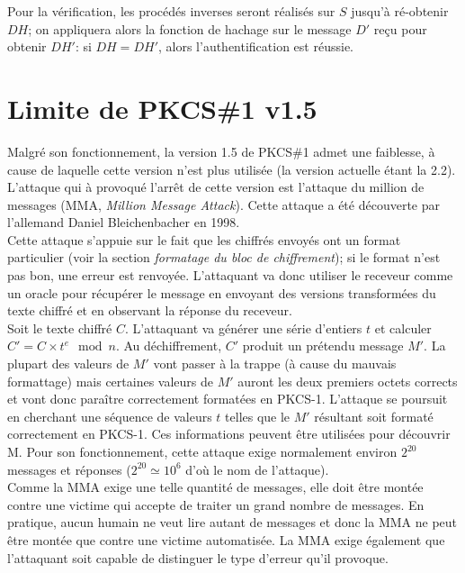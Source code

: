 \documentclass{article}
\begin{document}
Pour la vérification, les procédés inverses seront réalisés sur $S$ jusqu’à ré-obtenir $DH$; on appliquera alors la fonction de hachage sur le message $D'$ reçu pour obtenir $DH'$: si $DH = DH'$, alors l’authentification est réussie.


\section{Limite de PKCS\#1 v1.5}
Malgré son fonctionnement, la version 1.5 de PKCS\#1 admet une faiblesse, à cause de laquelle cette version n'est plus utilisée (la version actuelle étant la 2.2).
\\L'attaque qui à provoqué l'arrêt de cette version est l'attaque du million de messages (MMA, \textit{Million Message Attack}). Cette attaque a été découverte par l'allemand Daniel Bleichenbacher en 1998.
\\Cette attaque s'appuie sur le fait que les chiffrés envoyés ont un format particulier (voir la section \textit{formatage du bloc de chiffrement}); si le format n'est pas bon, une erreur est renvoyée. L'attaquant va donc utiliser le receveur comme un oracle pour récupérer le message en envoyant des versions transformées du texte chiffré et en observant la réponse du receveur.
\\Soit le texte chiffré $C$. L'attaquant va générer une série d'entiers $t$ et calculer $C'= C \times t^e \mod n$. Au déchiffrement, $C'$ produit un prétendu message $M'$. La plupart des valeurs de $M'$ vont passer à la trappe (à cause du mauvais formattage) mais certaines valeurs de $M'$ auront les deux premiers octets corrects et vont donc paraître correctement formatées en PKCS-1. L'attaque se poursuit en cherchant une séquence de valeurs $t$ telles que le $M'$ résultant soit formaté correctement en PKCS-1. Ces informations peuvent être utilisées pour découvrir M. Pour son fonctionnement, cette attaque exige normalement environ $2^{20}$ messages et réponses ($2^{20} \simeq 10^6$ d'où le nom de l'attaque). 
\\Comme la MMA exige une telle quantité de messages, elle doit être montée contre une victime qui accepte de traiter un grand nombre de messages. En pratique, aucun humain ne veut lire autant de messages et donc la MMA ne peut être montée que contre une victime automatisée. La MMA exige également que l'attaquant soit capable de distinguer le type d'erreur qu'il provoque.

\newpage


\cite{1} \cite{2} \cite{3} \cite{4} \cite{5}

\end{document}
